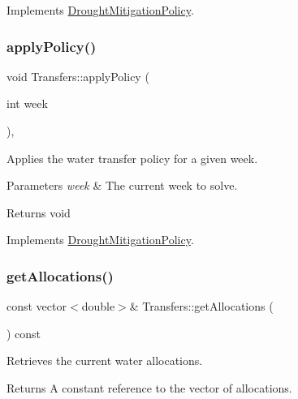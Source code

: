 Implements \mbox{\hyperlink{classDroughtMitigationPolicy_aaab042a79d781afe8e08753b7012372a}{Drought\+Mitigation\+Policy}}.

\mbox{\label{classTransfers_ad9e4e83ff763ac1ba518a19051cd2e69}} 
\subsubsection{\texorpdfstring{apply\+Policy()}{applyPolicy()}}
{\footnotesize\ttfamily void Transfers\+::apply\+Policy (\begin{DoxyParamCaption}\item[{int}]{week }\end{DoxyParamCaption})\hspace{0.3cm}{\ttfamily [override]}, {\ttfamily [virtual]}}



Applies the water transfer policy for a given week. 


\begin{DoxyParams}{Parameters}
{\em week} & The current week to solve.\\
\hline
\end{DoxyParams}
\begin{DoxyReturn}{Returns}
void 
\end{DoxyReturn}


Implements \mbox{\hyperlink{classDroughtMitigationPolicy_a76c1a85eaf7707306fe173b6437cc31d}{Drought\+Mitigation\+Policy}}.

\mbox{\label{classTransfers_abb5bd2978727424dc524c401dca0cbaf}} 
\subsubsection{\texorpdfstring{get\+Allocations()}{getAllocations()}}
{\footnotesize\ttfamily const vector$<$double$>$\& Transfers\+::get\+Allocations (\begin{DoxyParamCaption}{ }\end{DoxyParamCaption}) const}



Retrieves the current water allocations. 

\begin{DoxyReturn}{Returns}
A constant reference to the vector of allocations. 
\end{DoxyReturn}
\mbox{\label{classTransfers_a75342a7c14b2ff69eb2520de240a1131}} 
